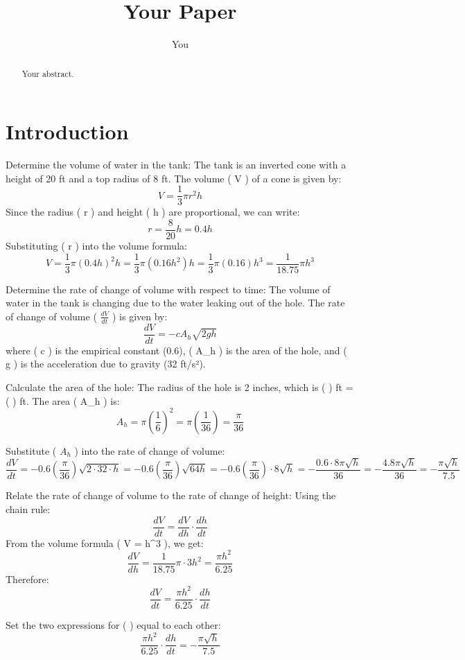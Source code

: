 \documentclass{article}
\title{Your Paper}
\author{You}
\begin{document}
\maketitle

\begin{abstract}
Your abstract.
\end{abstract}

\section{Introduction}

Determine the volume of water in the tank:
The tank is an inverted cone with a height of 20 ft and a top radius of 8 ft. The volume ( V ) of a cone is given by:
$$
V = \frac{1}{3} \pi r^2 h
$$
Since the radius ( r ) and height ( h ) are proportional, we can write:
$$
r = \frac{8}{20} h = 0.4h
$$
Substituting ( r ) into the volume formula:
$$
V = \frac{1}{3} \pi (0.4h)^2 h = \frac{1}{3} \pi (0.16h^2) h = \frac{1}{3} \pi (0.16) h^3 = \frac{1}{18.75} \pi h^3
$$

Determine the rate of change of volume with respect to time:
The volume of water in the tank is changing due to the water leaking out of the hole. The rate of change of volume ( $\frac{dV}{dt}$ ) is given by:
$$
\frac{dV}{dt} = -c A_h \sqrt{2gh}
$$
where ( c ) is the empirical constant (0.6), ( A_h ) is the area of the hole, and ( g ) is the acceleration due to gravity (32 ft/s²).

Calculate the area of the hole:
The radius of the hole is 2 inches, which is (  ) ft = (  ) ft. The area ( A_h ) is:
$$
A_h = \pi \left( \frac{1}{6} \right)^2 = \pi \left( \frac{1}{36} \right) = \frac{\pi}{36}
$$

Substitute ( $A_h$ ) into the rate of change of volume:
$$
\frac{dV}{dt} = -0.6 \left( \frac{\pi}{36} \right) \sqrt{2 \cdot 32 \cdot h} = -0.6 \left( \frac{\pi}{36} \right) \sqrt{64h} = -0.6 \left( \frac{\pi}{36} \right) \cdot 8 \sqrt{h} = -\frac{0.6 \cdot 8 \pi \sqrt{h}}{36} = -\frac{4.8 \pi \sqrt{h}}{36} = -\frac{\pi \sqrt{h}}{7.5}
$$

Relate the rate of change of volume to the rate of change of height:
Using the chain rule:
$$
\frac{dV}{dt} = \frac{dV}{dh} \cdot \frac{dh}{dt}
$$
From the volume formula ( V =  \pi h^3 ), we get:
$$
\frac{dV}{dh} = \frac{1}{18.75} \pi \cdot 3h^2 = \frac{\pi h^2}{6.25}
$$
Therefore:
$$
\frac{dV}{dt} = \frac{\pi h^2}{6.25} \cdot \frac{dh}{dt}
$$

Set the two expressions for (  ) equal to each other:
$$
\frac{\pi h^2}{6.25} \cdot \frac{dh}{dt} = -\frac{\pi \sqrt{h}}{7.5}
$$
\end{document}
